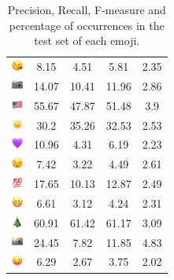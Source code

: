 \documentclass{article}
\begin{document}
\begin{table}
\begin{tabular}{|c|ccc|c|}
\includegraphics[height=0.37cm,width=0.37cm]{img/face_blowing_a_kiss.png} & 8.15 & 4.51 & 5.81 & 2.35\\ 
\includegraphics[height=0.37cm,width=0.37cm]{img/camera.png} & 14.07 & 10.41 & 11.96 & 2.86\\ 
\includegraphics[height=0.37cm,width=0.37cm]{img/United_States.png} & 55.67 & 47.87 & 51.48 & 3.9\\ 
\includegraphics[height=0.37cm,width=0.37cm]{img/sun.png} & 30.2 & 35.26 & 32.53 & 2.53\\ 
\includegraphics[height=0.37cm,width=0.37cm]{img/purple_heart.png} & 10.96 & 4.31 & 6.19 & 2.23\\ 
\includegraphics[height=0.37cm,width=0.37cm]{img/winking_face.png} & 7.42 & 3.22 & 4.49 & 2.61\\ 
\includegraphics[height=0.37cm,width=0.37cm]{img/hundred_points.png} & 17.65 & 10.13 & 12.87 & 2.49\\ 
\includegraphics[height=0.37cm,width=0.37cm]{img/beaming_face_with_smiling_eyes.png} & 6.61 & 3.12 & 4.24 & 2.31\\ 
\includegraphics[height=0.37cm,width=0.37cm]{img/Christmas_tree.png} & 60.91 & 61.42 & 61.17 & 3.09\\ 
\includegraphics[height=0.37cm,width=0.37cm]{img/camera_with_flash.png} & 24.45 & 7.82 & 11.85 & 4.83\\ 
\includegraphics[height=0.37cm,width=0.37cm]{img/winking_face_with_tongue.png} & 6.29 & 2.67 & 3.75 & 2.02\\ 

\hline
\end{tabular}
\caption{\label{table:emoji_detailed} Precision, Recall, F-measure and percentage of occurrences in the test set of each emoji.}
\end{table}
\end{document}
